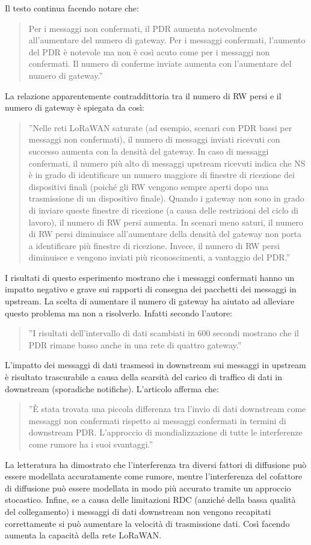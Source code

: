 \documentclass[a4paper]{report} %
\begin{document}
Il testo \cite{art:rif.49} continua facendo notare che:
\begin{quote}
	Per i messaggi non confermati, il PDR aumenta notevolmente all'aumentare del numero di gateway. Per i messaggi confermati, l'aumento del PDR è notevole ma non è così acuto come per i messaggi non confermati. Il numero di conferme inviate aumenta con l'aumentare del numero di gateway.''
\end{quote}
La relazione apparentemente contraddittoria tra il numero di RW persi e il numero di gateway è spiegata da \cite{art:rif.49} così:
\begin{quote}	
	''Nelle reti LoRaWAN saturate (ad esempio, scenari con PDR bassi per messaggi non confermati), il numero di messaggi inviati ricevuti con successo aumenta con la densità del gateway. In caso di messaggi confermati, il numero più alto di messaggi upstream ricevuti indica che NS è in grado di identificare un numero maggiore di finestre di ricezione dei dispositivi finali (poiché gli RW vengono sempre aperti dopo una trasmissione di un dispositivo finale). Quando i gateway non sono in grado di inviare queste finestre di ricezione (a causa delle restrizioni del ciclo di lavoro), il numero di RW persi aumenta. In scenari meno saturi, il numero di RW persi diminuisce all'aumentare della densità del gateway non porta a identificare più finestre di ricezione. Invece, il numero di RW persi diminuisce e vengono inviati più riconoscimenti, a vantaggio del PDR.''
\end{quote}
I risultati di questo esperimento \cite{art:rif.49} mostrano che i messaggi confermati hanno un impatto negativo e grave sui rapporti di consegna dei pacchetti dei messaggi in upstream. La scelta di aumentare il numero di gateway ha aiutato ad alleviare questo problema ma non a risolverlo. Infatti secondo l'autore:
\begin{quote}
	''I risultati dell'intervallo di dati scambiati in 600 secondi mostrano che il PDR rimane basso anche in una rete di quattro gateway.''
\end{quote}
L'impatto dei messaggi di dati trasmessi in downstream sui messaggi in upstream è risultato trascurabile a causa della scarsità del carico di traffico di dati in downstream (sporadiche notifiche). L'articolo \cite{art:rif.49} afferma che:
\begin{quote}
	''È stata trovata una piccola differenza tra l'invio di dati downstream come messaggi non confermati rispetto ai messaggi confermati in termini di downstream PDR. L'approccio di mondializzazione di tutte le interferenze come rumore ha i suoi svantaggi.''
\end{quote}
La letteratura ha dimostrato che l'interferenza tra diversi fattori di diffusione può essere modellata accuratamente come rumore, mentre l'interferenza del cofattore di diffusione può essere modellata in modo più accurato tramite un approccio stocastico.
Infine, se a causa delle limitazioni RDC (anziché della bassa qualità del collegamento) i messaggi di dati downstream non vengono recapitati correttamente si può aumentare la velocità di trasmissione dati. Così facendo aumenta la capacità della rete LoRaWAN. 
\end{document}
